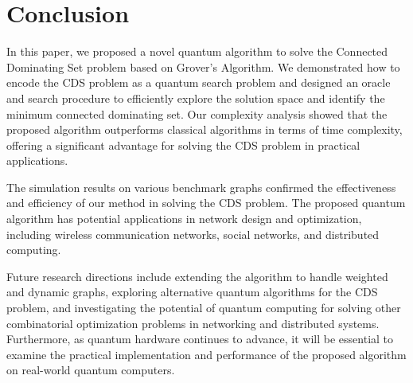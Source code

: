 \section{Conclusion}\label{sec:conclusion}
In this paper, we proposed a novel quantum algorithm to solve the Connected Dominating Set problem based on Grover's Algorithm. We demonstrated how to encode the CDS problem as a quantum search problem and designed an oracle and search procedure to efficiently explore the solution space and identify the minimum connected dominating set. Our complexity analysis showed that the proposed algorithm outperforms classical algorithms in terms of time complexity, offering a significant advantage for solving the CDS problem in practical applications.

The simulation results on various benchmark graphs confirmed the effectiveness and efficiency of our method in solving the CDS problem. The proposed quantum algorithm has potential applications in network design and optimization, including wireless communication networks, social networks, and distributed computing.

Future research directions include extending the algorithm to handle weighted and dynamic graphs, exploring alternative quantum algorithms for the CDS problem, and investigating the potential of quantum computing for solving other combinatorial optimization problems in networking and distributed systems. Furthermore, as quantum hardware continues to advance, it will be essential to examine the practical implementation and performance of the proposed algorithm on real-world quantum computers.

